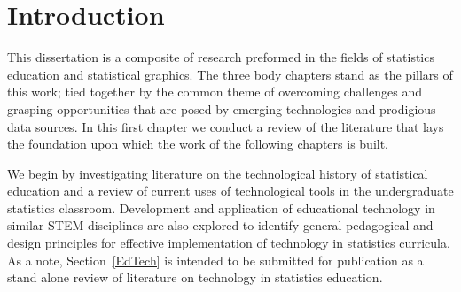 \documentclass[11pt]{isuthesis}\usepackage[]{graphicx}\usepackage[]{color}
\begin{document}

% 
\tableofcontents
{} \cleardoublepage {}
{}
\listoftables
\cleardoublepage {} {}
\listoffigures
\cleardoublepage {}

\cleardoublepage {}

\newpage
{}

\section{Introduction}

This dissertation is a composite of research preformed in the fields of statistics education and statistical graphics. The three body chapters stand as the pillars of this work; tied together by the common theme of overcoming challenges and grasping opportunities that are posed by emerging technologies and prodigious data sources. In this first chapter we conduct a review of the literature that lays the foundation upon which the work of the following chapters is built. 

We begin by investigating literature on the technological history of statistical education and a review of current uses of technological tools in the undergraduate statistics classroom. Development and application of educational technology in similar STEM disciplines are also explored to identify general pedagogical and design principles for effective implementation of technology in statistics curricula. As a note, Section~\ref{EdTech} is intended to be submitted for publication as a stand alone review of literature on technology in statistics education.
\end{document}
